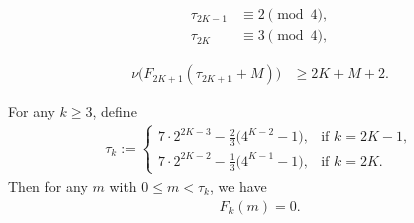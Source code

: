 \documentclass[10pt,a4paper]{amsart}
\begin{document}
	\begin{align}
		\tau_{2K-1} &\equiv 2 \pmod{4},\label{eq:tau-odd-mod-4}\\
		\tau_{2K} &\equiv 3 \pmod{4},\label{eq:tau-even-mod-4}
	\end{align}

	\begin{align}\label{eq:F-nu-m}
		\nu\big(F_{2K+1}(\tau_{2K+1}+M)\big) &\ge 2K+M+2.
	\end{align}

\begin{theorem}\label{th:F-nonvanishing}
	For any $k\ge 3$, define
	\begin{align*}
		\tau_{k}:=\begin{cases}
			7\cdot 2^{2K-3}-\tfrac{2}{3}\big(4^{K-2}-1\big), & \text{if $k=2K-1$},\\[6pt]
			7\cdot 2^{2K-2}-\tfrac{1}{3}\big(4^{K-1}-1\big), & \text{if $k=2K$}.
		\end{cases}
	\end{align*}
	Then for any $m$ with $0\le m< \tau_k$, we have
	\begin{align*}
		F_k(m) = 0.
	\end{align*}
\end{theorem}
\end{document}
